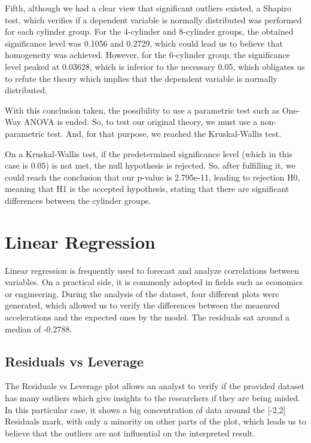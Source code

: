 \documentclass[conference]{IEEEtran}
\begin{document}
Fifth, although we had a clear view that significant outliers existed, a Shapiro test, which verifies if a dependent variable is normally distributed was performed for each cylinder group.
For the 4-cylinder and 8-cylinder groups, the obtained significance level was 0.1056 and 0.2729, which could lead us to believe that homogeneity was achieved.
However, for the 6-cylinder group, the significance level peaked at 0.03628, which is inferior to the necessary 0.05, 
which obligates us to refute the theory which implies that the dependent variable is normally distributed.

With this conclusion taken, the possibility to use a parametric test such as One-Way ANOVA is ended. So, to test our original theory, we must use a 
non-parametric test. And, for that purpose, we reached the Kruskal-Wallis test.

On a Kruskal-Wallis test, if the predetermined significance level (which in this case is 0.05) is not met, the null hypothesis is rejected.
So, after fulfilling it, we could reach the conclusion that our p-value is 2.795e-11, leading to rejection H0, meaning that H1 is the accepted hypothesis, 
stating that there are significant differences between the cylinder groups.

\section{Linear Regression}

Linear regression is frequently used to forecast and analyze correlations between variables. On a practical side, it is commonly adopted in fields such as economics or engineering.
During the analysis of the dataset, four different plots were generated, which allowed us to verify the differences between the measured accelerations and the expected ones by the model.
The residuals sat around a median of -0.2788.

\subsection{Residuals vs Leverage}

The Residuals vs Leverage plot allows an analyst to verify if the provided dataset has many outliers which give insights to the researchers if they are being misled.
In this particular case, it shows a big concentration of data around the [-2,2] Residuals mark, 
with only a minority on other parts of the plot, which leads us to believe that the outliers are not influential on the interpreted result.
\end{document}

